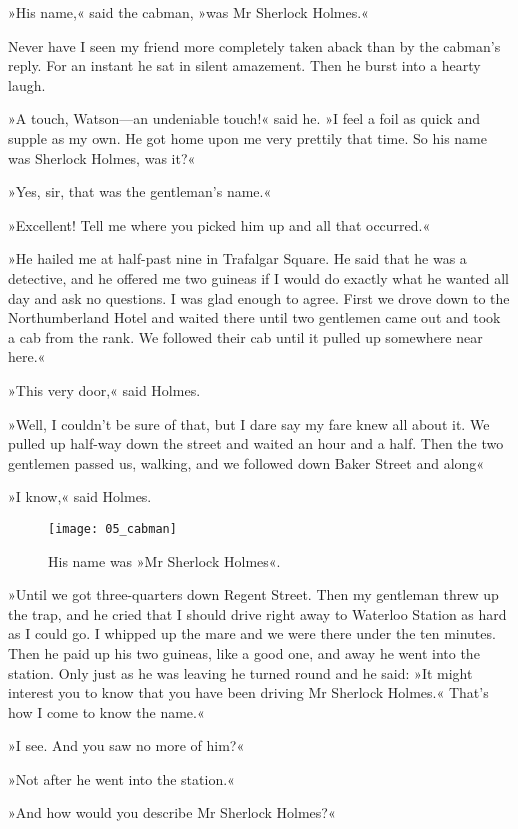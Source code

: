 »His name,« said the cabman, »was Mr Sherlock Holmes.«

Never have I seen my friend more completely taken aback than by the cabman's reply. For an instant he sat in silent amazement. Then he burst into a hearty laugh.

»A touch, Watson—an undeniable touch!« said he. »I feel a foil as quick and supple as my own. He got home upon me very prettily that time. So his name was Sherlock Holmes, was it?«

»Yes, sir, that was the gentleman's name.«

»Excellent! Tell me where you picked him up and all that occurred.«

»He hailed me at half-past nine in Trafalgar Square. He said that he was a detective, and he offered me two guineas if I would do exactly what he wanted all day and ask no questions. I was glad enough to agree. First we drove down to the Northumberland Hotel and waited there until two gentlemen came out and took a cab from the rank. We followed their cab until it pulled up somewhere near here.«

»This very door,« said Holmes.

»Well, I couldn't be sure of that, but I dare say my fare knew all about it. We pulled up half-way down the street and waited an hour and a half. Then the two gentlemen passed us, walking, and we followed down Baker Street and along\longdash«

»I know,« said Holmes.

\begin{figure}[tbh!]
\centering
\texttt{[image: 05\_cabman]}
\caption{His name was »Mr Sherlock Holmes«.}
\end{figure}

»Until we got three-quarters down Regent Street. Then my gentleman threw up the trap, and he cried that I should drive right away to Waterloo Station as hard as I could go. I whipped up the mare and we were there under the ten minutes. Then he paid up his two guineas, like a good one, and away he went into the station. Only just as he was leaving he turned round and he said: »It might interest you to know that you have been driving Mr Sherlock Holmes.« That's how I come to know the name.«

»I see. And you saw no more of him?«

»Not after he went into the station.«

»And how would you describe Mr Sherlock Holmes?«

